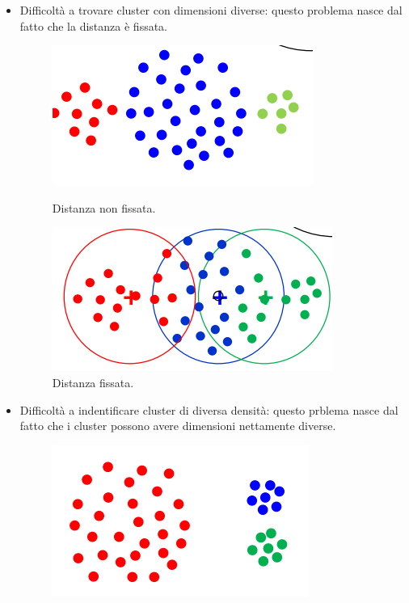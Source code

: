 \begin{itemize}
	\item Difficoltà a trovare cluster con dimensioni diverse: questo problema nasce dal fatto che la distanza è fissata.
	\begin{figure}[H]
		\begin{minipage}[b]{0.30\textwidth}
			\centering
			\includegraphics[width=\textwidth]{clustering/pict/distanza_fissata_1.png}
			\caption{Distanza non fissata.}
		\end{minipage}
		\hfill
		\begin{minipage}[b]{0.30\textwidth}
			\centering
			\includegraphics[width=\textwidth]{clustering/pict/distanza_fissata_2.png}
			\caption{Distanza fissata.}
		\end{minipage}
	\end{figure}
	\item Difficoltà a indentificare cluster di diversa densità: questo prblema nasce dal fatto che i cluster possono avere dimensioni nettamente diverse.
	\begin{figure}[H]
		\begin{minipage}[b]{0.30\textwidth}
			\centering
			\includegraphics[width=\textwidth]{clustering/pict/densita_1.png}

\end{minipage}
\end{figure}
\end{itemize}
